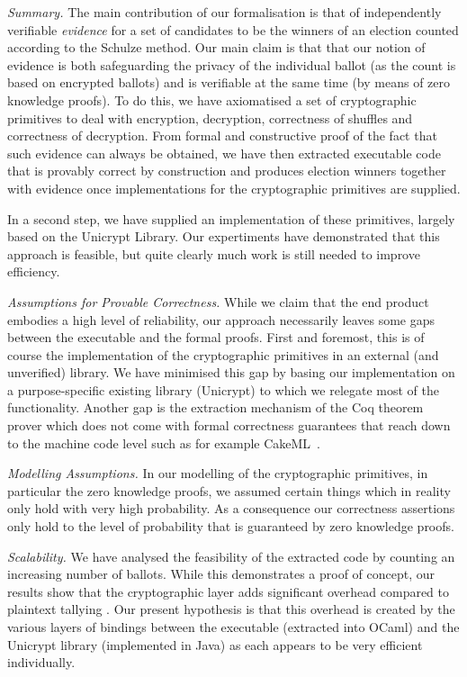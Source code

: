 \documentclass{llncs}
\begin{document}
\noindent\emph{Summary.} The main contribution of our formalisation is that of independently
verifiable \emph{evidence} for a set of candidates to be the winners
of an election counted according to the Schulze method. Our main
claim is that that our notion of evidence is both safeguarding the
privacy of the individual ballot (as the count is based on encrypted
ballots) and is verifiable at the same time (by means of zero
knowledge proofs). To do this, we have axiomatised a set of
cryptographic primitives to deal with encryption, decryption,
correctness of shuffles and correctness of decryption. From formal
and constructive proof of the fact that such evidence can always be
obtained, we have then extracted executable code that is provably
correct by construction and produces election winners together with
evidence once implementations for the cryptographic primitives are
supplied.

In a second step, we have supplied an implementation of these
primitives, largely based on the Unicrypt Library. Our expertiments
have demonstrated that this approach is feasible, but quite clearly
much work is still needed to improve efficiency. 

\smallskip\noindent\emph{Assumptions for Provable Correctness.}
While we claim that the end product embodies a high level of
reliability, our approach necessarily leaves some gaps between the
executable and the formal proofs. First and foremost, this is of
course the implementation of the cryptographic primitives in an
external (and unverified) library. We have minimised this gap by
basing our implementation on a purpose-specific existing library
(Unicrypt) to which we relegate most of the functionality. Another
gap is the extraction mechanism of the Coq theorem prover which does
not come with formal correctness guarantees that reach down to the
machine code level such as for example CakeML~\cite{Kumar:2014:CVI}.

\smallskip\noindent\emph{Modelling Assumptions.} In our modelling of
the cryptographic primitives, in particular the zero knowledge
proofs, we assumed certain things which in reality only hold with
very high probability. As a
consequence our correctness assertions only hold to the level
of probability that is guaranteed by zero knowledge proofs.

\smallskip\noindent\emph{Scalability.} We have analysed the
feasibility of the extracted code by counting an increasing number
of ballots. While this demonstrates a proof of concept, our results
show that the cryptographic layer adds significant overhead compared
to plaintext tallying \cite{Pattinson:2017:SVE}.  Our present
hypothesis is that this overhead is created by the various layers of
bindings between the executable (extracted into OCaml) and the
Unicrypt library (implemented in Java) as each appears to be very
efficient individually. 
\end{document}
